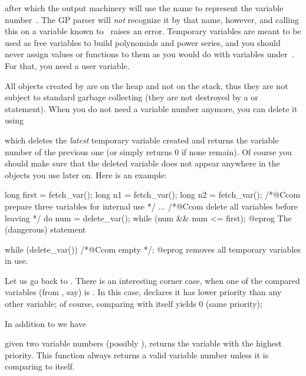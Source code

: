
\noindent after which the output machinery will use the name  to
represent the variable number~. The GP parser will \emph{not}
recognize it by that name, however, and calling this on a variable known
to~ raises an error. Temporary variables are meant to be used as free
variables to build polynomials and power series, and you should never assign
values or functions to them as you would do with variables under~.
For that, you need a user variable.

All objects created by  are on the heap and not on the stack,
thus they are not subject to standard garbage collecting (they are not
destroyed by a  or  statement).
When you do not need a variable number anymore, you can delete it using


\noindent which deletes the \emph{latest} temporary variable created and
returns the variable number of the previous one (or simply returns 0 if none
remain). Of course you should make sure that
the deleted variable does not appear anywhere in the objects you use later
on. Here is an example:

\bprog
  long first = fetch_var();
  long n1 = fetch_var();
  long n2 = fetch_var(); /*@Ccom prepare three variables for internal use */
  ...
  /*@Ccom delete all variables before leaving */
  do { num = delete_var(); } while (num && num <= first);
@eprog\noindent
The (dangerous) statement

\bprog
  while (delete_var()) /*@Ccom empty */;
@eprog\noindent
removes all temporary variables in use.


Let us go back to . There is an interesting corner case, when
one of the compared variables (from , say) is .
In this case,  declares it has lower priority than any other
variable; of course, comparing  with itself yields
$0$ (same priority);

In addition to  we have

 given two variable numbers (possibly
), returns the variable with the highest priority.
This function always returns a valid variable number unless it is comparing
 to itself.


